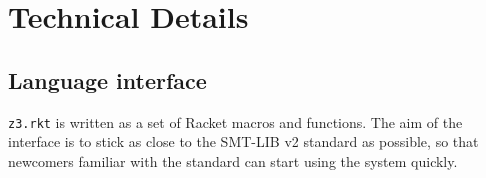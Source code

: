 \section{Technical Details}

\subsection{Language interface}

\texttt{z3.rkt} is written as a set of Racket macros and functions. The aim of
the interface is to stick as close to the SMT-LIB v2 standard \cite{smtlib2:10}
as possible, so that newcomers familiar with the standard can start using the
system quickly.
